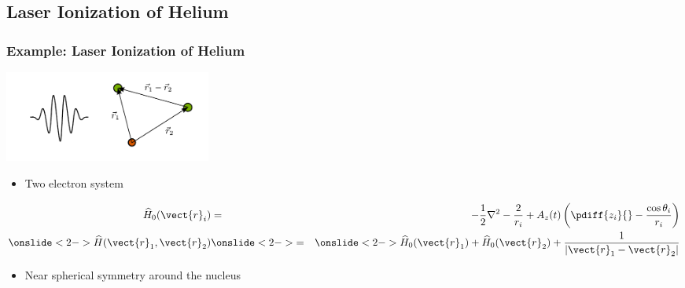 \documentclass{beamer}
\begin{document}
\subsection{Laser Ionization of Helium}

\begin{frame}
	\frametitle{Example: Laser Ionization of Helium}

	\begin{center}
		\includegraphics[height=3cm]{figurer/helium}
	\end{center}
	\vspace{-1cm}

	\begin{itemize}
		\item Two electron system
	\end{itemize}
	\vspace{-1cm}

	\begin{eqnarray*}
		\widehat{H}_0(\vect{r}_i) &=& -\frac{1}{2} \nabla^2 - \frac{2}{r_i}  + A_z(t) \left( \pdiff{z_i}{} - \frac{\cos \theta_i}{r_i} \right)\\
		\onslide<2->{ \widehat{H}(\vect{r}_1,\vect{r}_2)   }
		& \onslide<2->{=}& 
		\onslide<2->{\widehat{H}_0(\vect{r}_1) + \widehat{H}_0(\vect{r}_2) + \frac{1}{|\vect{r}_1 - \vect{r}_2|} }
	\end{eqnarray*}
	\vspace{-0.5cm}

	\begin{itemize}
		\item<3-> Near spherical symmetry around the nucleus
	\end{itemize}
\end{frame}
\end{document}
